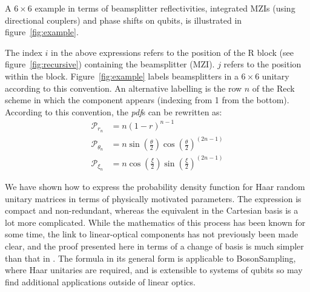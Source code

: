 \documentclass[aps,prl,twocolumn,floatfix]{revtex4}
\newcommand{\mat}[1]{\mathrm{#1}}
\newcommand{\by}{\times}
\newcommand{\of}[1]{\!\left(#1\right)}
\newcommand{\pdf}{{\it pdf}}
\newcommand{\prob}[1]{\mathcal{#1}}
\newcommand{\bosonsampling}{\textsc BosonSampling}
\begin{document}
A \( 6 \by 6 \) example in terms of beamsplitter reflectivities, integrated MZIs
(using directional couplers) and phase shifts on qubits, is illustrated in
figure~\ref{fig:example}.

The index \(i\) in the above expressions refers to the position of the
\(\mat{R}\) block (see figure~\ref{fig:recursive}) containing the beamsplitter
(MZI). \(j\) refers to the position within the block. Figure~\ref{fig:example}
labels beamsplitters in a \(6 \by 6\) unitary according to this convention. An
alternative labelling is the row \(n\) of the Reck scheme in which the component
appears (indexing from 1 from the bottom). According to this convention, the
\pdf{}s can be rewritten as:
\begin{align}
  \prob{P}_{r_{n}} &= n \left( 1-r \right)^{n-1} \\
  \prob{P}_{\theta_{n}} &= n \sin \of{ \frac{\theta}{2} } \cos \of{ \frac{
  \theta}{2}}^{\left( 2n-1 \right)} \\
  \prob{P}_{\xi_{n}} &= n \cos \of{ \frac{\xi}{2} } \sin \of{ \frac{\xi}{2} }^{
  \left( 2n-1 \right) }
\end{align}

We have shown how to express the probability density function for Haar random
unitary matrices in terms of physically motivated parameters. The expression is
compact and non-redundant, whereas the equivalent in the Cartesian basis is a
lot more complicated. While the mathematics of this process has been known
for some time, the link to linear-optical components has not previously been
made clear, and the proof presented here in terms of a change of basis is much
simpler than that in \cite{sp-jpa-43-385306}. The formula in its general form
is applicable to \bosonsampling{}, where Haar unitaries are required, and is
extensible to systems of qubits so may find additional applications outside of
linear optics.
\end{document}
